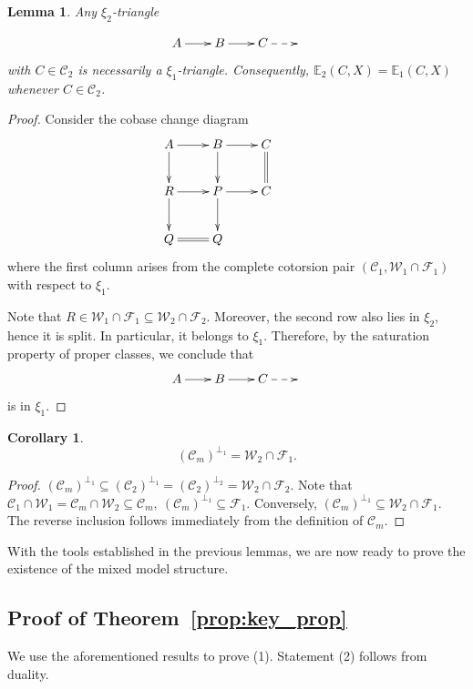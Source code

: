\documentclass[11pt,a4paper]{amsart}
\numberwithin{equation}{section}
\theoremstyle{plain}
\newtheorem{lem}[thm]{Lemma}
\newtheorem{cor}[thm]{Corollary}
\begin{document}
\begin{lem}\label{lem:extension-comparison}
	Any $\xi_2$-triangle

\[
\xymatrix@C=2em{
A \ar[r] &
	B \ar[r] &
	C\ar@{-->}[r] &
	{}
}
\]
	with $C\in\mathcal{C}_2$ is necessarily a $\xi_1$-triangle. Consequently,
	$
	\mathbb{E}_{2}(C,X)
	=
	\mathbb{E}_{1}(C,X)
	$
	whenever $C\in\mathcal{C}_2$.
\end{lem}
\begin{proof}Consider the cobase change diagram
	\begin{displaymath}
		\xymatrix{A \ar[r]\ar[d] & B \ar[r]\ar[d]^{} & C \ar@{=}[d] & \\
			R \ar[r]^{} \ar[d] & P \ar[r] \ar[d] & C  &  \\
			Q \ar@{=}[r]  & Q  &  & \\
			 }
	\end{displaymath}
	where the first column arises from the complete cotorsion pair
	$(\mathcal{C}_1,\mathcal{W}_1 \cap \mathcal{F}_1)$ with respect to $\xi_1$.
	
	Note that $R \in \mathcal{W}_1 \cap \mathcal{F}_1 \subseteq \mathcal{W}_2 \cap \mathcal{F}_2$. Moreover, the second row also lies in $\xi_2$, hence it is split. In particular, it belongs to $\xi_1$.
	Therefore, by the saturation property of proper classes, we conclude that
\[
\xymatrix@C=2em{
	A \ar[r] &
	B \ar[r] &
	C\ar@{-->}[r] &
	{}
}
\]
	is in $\xi_1$.
\end{proof}
\begin{cor}
		\[
	(\mathcal{C}_m)^{\perp_1}=\mathcal{W}_2\cap \mathcal{F}_1.
	\]
\end{cor}
\begin{proof}
	$(\mathcal{C}_m)^{\perp_1}\subseteq(\mathcal{C}_2)^{\perp_1}=(\mathcal{C}_2)^{\perp_2}=\mathcal{W}_2\cap \mathcal{F}_2$.
	Note that $\mathcal{C}_1\cap \mathcal{W}_1 = \mathcal{C}_m\cap \mathcal{W}_2\subseteq \mathcal{C}_m,\ 
	(\mathcal{C}_m)^{\perp_1}\subseteq  \mathcal{F}_1$. Conversely,
	$(\mathcal{C}_m)^{\perp_1}\subseteq \mathcal{W}_2\cap \mathcal{F}_1.$ The reverse inclusion follows immediately from the definition of $ \mathcal {C}_m$.
\end{proof}
With the tools established in the previous lemmas, we are now ready to prove the existence of the mixed model structure.
\subsection{Proof of Theorem~\ref{prop:key_prop}}

We use the aforementioned results to prove (1). Statement (2) follows from duality.\\
\end{document}
